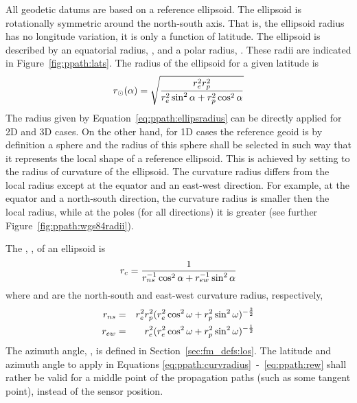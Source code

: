 All geodetic datums are based on a reference ellipsoid. The ellipsoid is rotationally symmetric around the
north-south axis. That is, the ellipsoid radius has no longitude
variation, it is only a function of latitude. The ellipsoid is
described by an equatorial radius, , and a polar radius,
. These radii are indicated in Figure~\ref{fig:ppath:lats}.
The radius of the ellipsoid for a given latitude is
\begin{equation}
 r_{\odot}(\alpha) = \sqrt{\frac{r_{e}^2r_{p}^2}
                    {r_{e}^2\sin^2\alpha+r_{p}^2\cos^2\alpha}}
 \label{eq:ppath:ellipsradius} 
\end{equation}
The radius given by Equation~\ref{eq:ppath:ellipsradius} can be
directly applied for 2D and 3D cases. On the other hand, for 1D cases
the reference geoid is by definition a sphere and the radius of this
sphere shall be selected in such way that it represents the local
shape of a reference ellipsoid. This is achieved by setting
\aRds{\odot} to the radius of curvature of the ellipsoid. The
curvature radius differs from the local radius except at the equator
and an east-west direction. For example, at the equator and a
north-south direction, the curvature radius is smaller then the local
radius, while at the poles (for all directions) it is greater (see
further Figure~\ref{fig:ppath:wgs84radii}). 


The , , of an ellipsoid is 
\citep{rodgers:00}
\begin{equation}
 r_{c} = \frac{1}{r_{ns}^{-1}\cos^2 \alpha + r_{ew}^{-1}\sin^2 \alpha}
 \label{eq:ppath:curvradius} 
\end{equation}
where  and  are the north-south and east-west curvature radius, respectively,
\begin{eqnarray}
 r_{ns} &=& r_{e}^2r_{p}^2 (
           r_{e}^2\cos^2\omega+r_{p}^2\sin^2\omega )^{-\frac{3}{2}} \\
 r_{ew} &=& r_{e}^2 (
           r_{e}^2\cos^2\omega+r_{p}^2\sin^2\omega )^{-\frac{1}{2}} 
 \label{eq:ppath:rew} 
\end{eqnarray}
The azimuth angle, \AzmAng, is defined in
Section~\ref{sec:fm_defs:los}. The latitude and azimuth angle to
apply in Equations \ref{eq:ppath:curvradius}~-~\ref{eq:ppath:rew}
shall rather be valid for a middle point of the propagation paths
(such as some tangent point), instead of the sensor position. 

